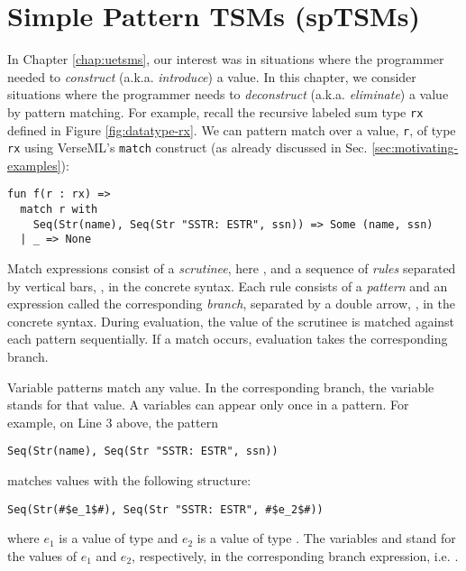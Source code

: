 \chapter{Simple Pattern TSMs (spTSMs)}\label{chap:uptsms}
In Chapter \ref{chap:uetsms}, our interest was in situations where the programmer needed to \emph{construct} (a.k.a. \emph{introduce}) a value. In this chapter, we consider situations where the programmer needs to \emph{deconstruct} (a.k.a. \emph{eliminate}) a value by pattern matching. For example, recall the recursive labeled sum type \lstinline{rx} defined in Figure \ref{fig:datatype-rx}. We can pattern match over a value, \lstinline{r}, of type \lstinline{rx} using VerseML's \lstinline{match} construct (as already discussed in Sec. \ref{sec:motivating-examples}): 
\begin{lstlisting}
fun f(r : rx) => 
  match r with 
    Seq(Str(name), Seq(Str "SSTR: ESTR", ssn)) => Some (name, ssn)
  | _ => None
\end{lstlisting}

Match expressions consist of a \emph{scrutinee}, here , and a sequence of \emph{rules} separated by vertical bars, \li{|}, in the concrete syntax. Each rule consists of a \emph{pattern} and an {expression} called the corresponding \emph{branch}, separated by a double arrow, \li{=>}, in the concrete syntax. During evaluation, the value of the scrutinee is matched against each pattern sequentially. If a match occurs, evaluation takes the corresponding branch. 

Variable patterns match any value. In the corresponding branch, the variable stands for that value. A variables can  appear only once in a pattern.  
For example, on Line 3 above, the pattern 
\begin{lstlisting}[numbers=none]
Seq(Str(name), Seq(Str "SSTR: ESTR", ssn))
\end{lstlisting}
matches values with the following structure: 
\begin{lstlisting}[numbers=none]
Seq(Str(#$e_1$#), Seq(Str "SSTR: ESTR", #$e_2$#))
\end{lstlisting}
where $e_1$ is a value of type  and $e_2$ is a value of type . The variables  and  stand for the values of $e_1$ and $e_2$, respectively, in the corresponding branch expression, i.e. . 

